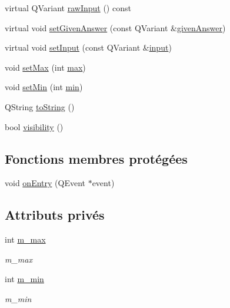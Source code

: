 \begin{DoxyCompactItemize}
virtual Q\-Variant \hyperlink{classSimpleHotel_1_1SH__InOutState_a5e8064672e20c7b13fec67a4955a3ce3}{raw\-Input} () const 
\item 
virtual void \hyperlink{classSimpleHotel_1_1SH__QuestionState_aeb4464741ecd13b283c504def63dd619}{set\-Given\-Answer} (const Q\-Variant \&\hyperlink{classSimpleHotel_1_1SH__QuestionState_a243f09bc1f822af7748edb038ac2957c}{given\-Answer})
\item 
virtual void \hyperlink{classSimpleHotel_1_1SH__QuestionState_ae404d8874e542fd5f3e6d658f003bae4}{set\-Input} (const Q\-Variant \&\hyperlink{classSimpleHotel_1_1SH__InOutState_a487d2ca6200fed372b1a27cfa27774db}{input})
\item 
void \hyperlink{classSimpleHotel_1_1SH__NumericQuestionState_a82351cd851dcd0972410a61b61ab7b18}{set\-Max} (int \hyperlink{classSimpleHotel_1_1SH__NumericQuestionState_a52840eebf864939b1294ac6e7c41c64f}{max})
\item 
void \hyperlink{classSimpleHotel_1_1SH__NumericQuestionState_aab2dfbe0a552dda59184db9e4d9befe5}{set\-Min} (int \hyperlink{classSimpleHotel_1_1SH__NumericQuestionState_a3417b383fb91874a6176b9fd1e19e6a4}{min})
\item 
Q\-String \hyperlink{classSimpleHotel_1_1SH__GenericState_adaded78178f9999a9e07a32871af5e61}{to\-String} ()
\item 
bool \hyperlink{classSimpleHotel_1_1SH__InOutState_a145a6e0e2c9e22971e35aa4538adeb4a}{visibility} ()
\end{DoxyCompactItemize}
\subsection*{Fonctions membres protégées}
\begin{DoxyCompactItemize}
\item 
void \hyperlink{classSimpleHotel_1_1SH__GenericState_adebdb330ff20556a54a833b15e50eacc}{on\-Entry} (Q\-Event $\ast$event)
\end{DoxyCompactItemize}
\subsection*{Attributs privés}
\begin{DoxyCompactItemize}
\item 
int \hyperlink{classSimpleHotel_1_1SH__NumericQuestionState_a91f7a59f3b71276a00286f617a3f30ff}{m\-\_\-max}
\begin{DoxyCompactList}\small\item\em m\-\_\-max \end{DoxyCompactList}\item 
int \hyperlink{classSimpleHotel_1_1SH__NumericQuestionState_a7fa94f78685336ee3635ce86a80f6908}{m\-\_\-min}
\begin{DoxyCompactList}\small\item\em m\-\_\-min \end{DoxyCompactList}\end{DoxyCompactItemize}


